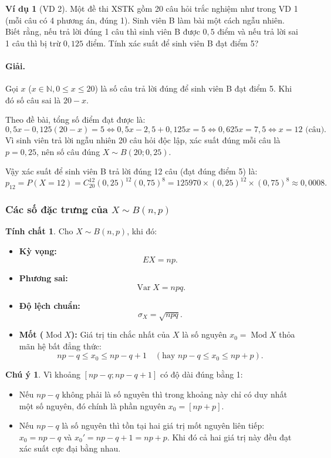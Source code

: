 \documentclass[12pt,a4paper]{article}
\theoremstyle{definition}
\newtheorem{vidu}{Ví dụ}[section]
\newtheorem{chuy}{Chú ý}[section]
\newtheorem{tinhchat}{Tính chất}[section]
\begin{document}
\begin{vidu}[VD 2]
Một đề thi XSTK gồm 20 câu hỏi trắc nghiệm như trong VD 1 (mỗi câu có 4 phương án, đúng 1). Sinh viên B làm bài một cách ngẫu nhiên. Biết rằng, nếu trả lời đúng 1 câu thì sinh viên B được $0{,}5$ điểm và nếu trả lời sai 1 câu thì bị trừ $0{,}125$ điểm. Tính xác suất để sinh viên B đạt điểm 5?

\paragraph{Giải.}
Gọi $x$ ($x \in \mathbb{N}, 0 \le x \le 20$) là số câu trả lời đúng để sinh viên B đạt điểm 5. Khi đó số câu sai là $20 - x$.

Theo đề bài, tổng số điểm đạt được là:
\[
0{,}5x - 0{,}125(20 - x) = 5 \iff 0{,}5x - 2{,}5 + 0{,}125x = 5 \iff 0{,}625x = 7{,}5 \iff x = 12 \text{ (câu)}.
\]
Vì sinh viên trả lời ngẫu nhiên 20 câu hỏi độc lập, xác suất đúng mỗi câu là $p = 0{,}25$, nên số câu đúng $X \sim B(20; 0{,}25)$.

Vậy xác suất để sinh viên B trả lời đúng 12 câu (đạt đúng điểm 5) là:
\[
p_{12} = P(X = 12) = C_{20}^{12} (0{,}25)^{12} (0{,}75)^{8} = 125970 \times (0{,}25)^{12} \times (0{,}75)^8 \approx 0{,}0008.
\]
\end{vidu}

\subsubsection{Các số đặc trưng của \texorpdfstring{$X \sim B(n, p)$}{X ~ B(n, p)}}

\begin{tinhchat}
Cho $X \sim B(n, p)$, khi đó:
\begin{itemize}
    \item \textbf{Kỳ vọng:}
    \[
    EX = np.
    \]
    \item \textbf{Phương sai:}
    \[
    \operatorname{Var} X = npq.
    \]
    \item \textbf{Độ lệch chuẩn:}
    \[
    \sigma_X = \sqrt{npq}.
    \]
    \item \textbf{Mốt ($\operatorname{Mod} X$):} Giá trị tin chắc nhất của $X$ là số nguyên $x_0 = \operatorname{Mod} X$ thỏa mãn hệ bất đẳng thức:
    \[
    np - q \le x_0 \le np - q + 1 \quad (\text{hay } np - q \le x_0 \le np + p).
    \]
\end{itemize}
\end{tinhchat}

\begin{chuy}
Vì khoảng $[np - q; np - q + 1]$ có độ dài đúng bằng 1:
\begin{itemize}
    \item Nếu $np - q$ không phải là số nguyên thì trong khoảng này chỉ có duy nhất một số nguyên, đó chính là phần nguyên $x_0 = [np + p]$.
    \item Nếu $np - q$ là số nguyên thì tồn tại hai giá trị mốt nguyên liên tiếp: $x_0 = np - q$ và $x_0' = np - q + 1 = np + p$. Khi đó cả hai giá trị này đều đạt xác suất cực đại bằng nhau.
\end{itemize}
\end{chuy}
\end{document}
